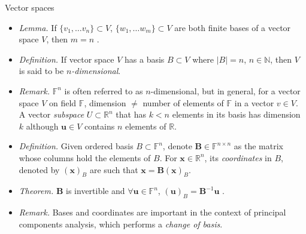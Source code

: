 \documentclass{beamer}
\numberwithin{equation}{section}
\begin{document}
\begin{frame}{Vector spaces}
    \begin{itemize}
        \item
        \textit{Lemma.} If $ \{v_1, \ldots v_n\} \subset V $,
        $ \{w_1, \ldots w_m\} \subset V $ are both finite bases of a vector
        space $ V $, then $ m = n $ \cite{jacob_linalg}.

        \item
        \textit{Definition.} If vector space $ V $ has a basis $ B \subset V $
        where $ |B| = n $, $ n \in \mathbb{N} $, then $ V $ is said to be
        $ n $\textit{-dimensional}.

        \item
        \textit{Remark.} $ \mathbb{F}^n $ is often referred to as
        $ n $-dimensional, but in general, for a vector space $ V $ on field
        $ \mathbb{F} $, dimension $ \ne $ number of elements of $ \mathbb{F} $
        in a vector $ v \in V $. A vector \textit{subspace} $ U \subset
        \mathbb{R}^n $ that has $ k < n $ elements in its basis has dimension
        $ k $ although $ \mathbf{u} \in V $ contains $ n $ elements of
        $ \mathbb{R} $.

        \item
        \textit{Definition.} Given ordered basis $ B \subset \mathbb{F}^n $,
        denote $ \mathbf{B} \in \mathbb{F}^{n \times n} $ as the matrix whose
        columns hold the elements of $ B $. For $ \mathbf{x} \in
        \mathbb{R}^n $, its \textit{coordinates} in $ B $, denoted by
        $ (\mathbf{x})_B $ are such that
        $ \mathbf{x} = \mathbf{B}(\mathbf{x})_B $.

        \item
        \textit{Theorem.} $ \mathbf{B} $ is invertible and
        $ \forall \mathbf{u} \in \mathbb{F}^n $,
        $ (\mathbf{u})_B = \mathbf{B}^{-1}\mathbf{u} $ \cite{jacob_linalg}.

        \item
        \textit{Remark.} Bases and coordinates are important in the context of
        principal components analysis, which performs a \textit{change of
        basis}.
    \end{itemize}
\end{frame}
\end{document}
